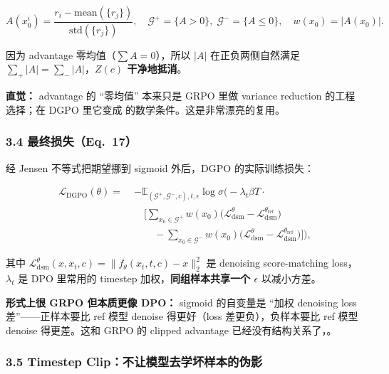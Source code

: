 \[
A(x_0^i)=\frac{r_i-\mathrm{mean}(\{r_j\})}{\mathrm{std}(\{r_j\})},
\quad
\mathcal{G}^{+}=\{A>0\},\;\mathcal{G}^{-}=\{A\le 0\},
\quad
w(x_0)=|A(x_0)|.
\]

因为 advantage 零均值（$\sum A=0$），所以 $|A|$ 在正负两侧自然满足 $\sum_{+}|A|=\sum_{-}|A|$，\textbf{$Z(c)$ 干净地抵消}。

\begin{intubox}
\textbf{直觉：} advantage 的 ``零均值'' 本来只是 GRPO 里做 variance reduction 的工程选择；在 DGPO 里它变成  的数学条件。这是非常漂亮的复用。
\end{intubox}

\subsubsection{3.4 最终损失（Eq.~17）}

经 Jensen 不等式把期望挪到 sigmoid 外后，DGPO 的实际训练损失：

\[
\begin{aligned}
\mathcal{L}_{\text{DGPO}}(\theta)
=\;&-\mathbb{E}_{(\mathcal{G}^{+},\mathcal{G}^{-},c),t,\epsilon}
\log\sigma\!\Big(-\lambda_t\beta T\cdot\\
&\quad \Big[
\sum_{x_0\in\mathcal{G}^{+}}w(x_0)\bigl(\mathcal{L}_{\text{dsm}}^{\theta}-\mathcal{L}_{\text{dsm}}^{\theta_{\text{ref}}}\bigr)\\
&\qquad -\sum_{x_0\in\mathcal{G}^{-}}w(x_0)\bigl(\mathcal{L}_{\text{dsm}}^{\theta}-\mathcal{L}_{\text{dsm}}^{\theta_{\text{ref}}}\bigr)
\Big]\Big),
\end{aligned}
\]

其中 $\mathcal{L}_{\text{dsm}}^{\theta}(x,x_t,c)=\|f_\theta(x_t,t,c)-x\|_2^2$ 是 denoising score-matching loss，$\lambda_t$ 是 DPO 里常用的 timestep 加权，\textbf{同组样本共享一个 $\epsilon$} 以减小方差。

\begin{warnbox}
\textbf{形式上很 GRPO 但本质更像 DPO：} sigmoid 的自变量是 ``加权 denoising loss 差''——正样本要比 ref 模型 denoise 得更好（loss 差更负），负样本要比 ref 模型 denoise 得更差。这和 GRPO 的 clipped advantage 已经没有结构关系了，。
\end{warnbox}

\subsubsection{3.5 Timestep Clip：不让模型去学坏样本的伪影}

